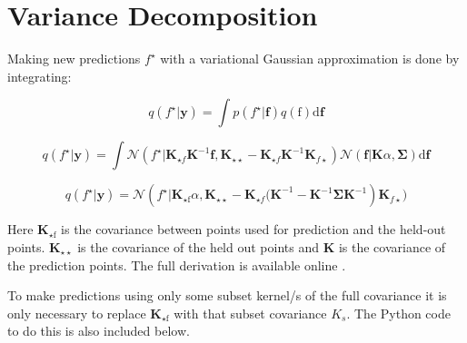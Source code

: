 \clearpage
\label{AppendixB}
\vspace{-1.75cm}
\section{Variance Decomposition}


Making new predictions $f ^ { \star }$ with a variational Gaussian approximation is done by integrating:


$$ q \left( f ^ { \star } | \mathbf { y } \right) = \int p \left( f ^ { \star } | \mathbf { f } \right) q ( \text{f} ) \text{d} \mathbf { f } $$




$$q \left( f ^ { \star } | \mathbf { y } \right) = \int \mathcal { N } \left( f ^ { \star } | \mathbf { K } _ { \star f } \mathbf { K } ^ { - 1} \mathbf { f } ,\mathbf { K } _ { \star \star } - \mathbf { K } _ { \star f } \mathbf { K } ^ { - 1} \mathbf { K } _ { f \star } \right) \mathcal { N } ( \mathbf { f } | \mathbf { K } \alpha ,\mathbf { \Sigma } ) \text{d} \mathbf { f }$$


$$ q \left( f ^ { \star } | \mathbf { y } \right) = \mathcal { N } \left( f ^ { \star } | \mathbf { K } _ { \star \text{f} } \alpha ,\mathbf { K } _ { \star \star } - \mathbf { K } _ { \star f } \mathbf { ( K } ^ { - 1} - \mathbf { K } ^ { - 1} \mathbf { \Sigma } \mathbf { K } ^ { - 1} \right) \mathbf { K } _ { f \star } ) $$

Here $\mathbf { K } _ { \star \text{f} }$ is the covariance between points used for prediction and the held-out points. $\mathbf { K } _ { \star \star }$ is the covariance of the held out points and $\mathbf { K }$ is the covariance of the prediction points. The full derivation is available online \cite{gpflow_conditional}. \par

To make predictions using only some subset kernel/s of the full covariance it is only necessary to replace $\mathbf { K } _ { \star \text{f} }$ with that subset covariance $K_s$. The Python code to do this is also included below.
